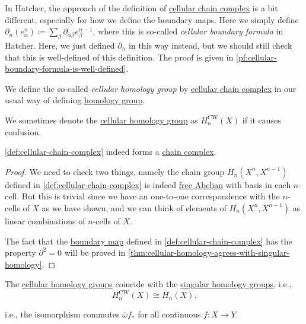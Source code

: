 \begin{note}
	In Hatcher\cite{hatcher2002algebraic}, the approach of the definition of \hyperref[def:cellular-chain-complex]{cellular chain complex} is
	a bit different, especially for how we define the boundary maps. Here we simply define \(\partial _n(e^n_\alpha ) \coloneqq \sum_\beta \partial _{\alpha \beta }e^{n-1}_\beta\),
	where this is so-called \emph{cellular boundary formula} in Hatcher\cite{hatcher2002algebraic}. Here, we just defined \(\partial _n\) in this way instead, but
	we should still check that this is well-defined of this definition. The proof is given in \autoref{pf:cellular-boundary-formula-is-well-defined}.
\end{note}

\begin{definition}\label{def:cellular-homology-group}
	We define the so-called \emph{cellular homology group} by \hyperref[def:cellular-chain-complex]{cellular chain complex} in our usual way of defining
	\hyperref[def:homology-group]{homology group}.
\end{definition}
\begin{remark}
	We sometimes denote the \hyperref[def:cellular-homology-group]{cellular homology group} as \(H_n^{\mathrm{CW} }(X) \) if it causes confusion.
\end{remark}
\begin{theorem}\label{thm:lec-32}
	\autoref{def:cellular-chain-complex} indeed forms a \hyperref[def:chain-complex]{chain complex}.
\end{theorem}
\begin{proof}
	We need to check two things, namely the chain group \(H_n(X^n, X^{n-1} )\) defined in \autoref{def:cellular-chain-complex}
	is indeed \hyperref[def:free-Abelian-group]{free Abelian} with basis in each \(n\)-cell. But this is trivial since we have
	an one-to-one correspondence with the \(n\)-cells of \(X\) as we have shown, and we can think of elements of \(H_n(X^n, X^{n-1} )\)
	as linear combinations of \(n\)-cells of \(X\).

	The fact that the \hyperref[def:boundary-homomorphism]{boundary map} defined in \autoref{def:cellular-chain-complex} has the property \(\partial ^{2} = 0\)
	will be proved in \autoref{thm:cellular-homology-agrees-with-singular-homology}.
\end{proof}
\begin{theorem}\label{thm:cellular-homology-agrees-with-singular-homology}
	The \hyperref[def:cellular-homology-group]{cellular homology groups} coincide with the \hyperref[def:singular-homology-group]{singular homology groups}, i.e.,
	\[
		H_n^{\mathrm{CW} }(X) \cong H_n(X).
	\]
\end{theorem}
\begin{note}
	i.e., the isomorphism commutes \(\overline{\omega} f_\ast\) for all continuous \(f\colon X\to Y\).
\end{note}

